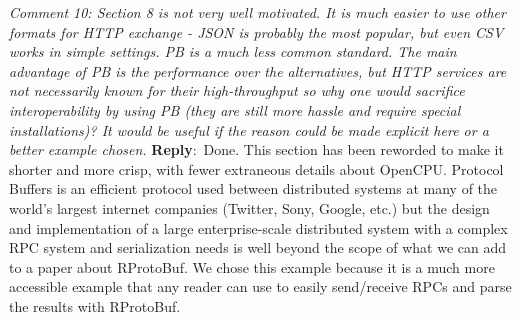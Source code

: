 \documentclass[10pt]{article}
\newcommand{\pointRaised}[2]{\smallskip %
  \textsl{{\fontseries{b}\selectfont #1}: #2}\newline}
\newcommand{\reply}[1]{\textbf{Reply}:\ #1 \smallskip } %
\begin{document}
\pointRaised{Comment 10}{Section 8 is not very well motivated. It is much easier to use other 
  formats for HTTP exchange - JSON is probably the most popular, but even
  CSV works in simple settings. PB is a much less common standard. The 
  main advantage of PB is the performance over the alternatives, but HTTP
  services are not necessarily known for their high-throughput so why one
  would sacrifice interoperability by using PB (they are still more hassle 
  and require special installations)? It would be useful if the reason 
  could be made explicit here or a better example chosen.}
\reply{Done. This section has been reworded to make it shorter and more
  crisp, with fewer extraneous details about OpenCPU. Protocol
  Buffers is an efficient protocol used between distributed systems at
  many of the world's largest internet companies (Twitter, Sony,
  Google, etc.) but the design and implementation of a large
  enterprise-scale distributed system with a complex RPC system and
  serialization needs is well beyond the scope of what we can add to a
  paper about RProtoBuf.  We chose this example because it is a much
  more accessible example that any reader can use to easily
  send/receive RPCs and parse the results with RProtoBuf.}
\end{document}
